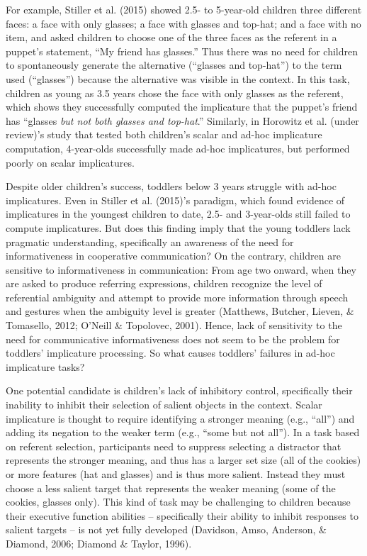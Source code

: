 \documentclass[a4paper,man,apacite,floatsintext]{apa6}
\begin{document}
For example, Stiller et al. (2015) showed 2.5- to 5-year-old children
three different faces: a face with only glasses; a face with glasses and
top-hat; and a face with no item, and asked children to choose one of
the three faces as the referent in a puppet's statement, ``My friend has
glasses.'' Thus there was no need for children to spontaneously generate
the alternative (``glasses and top-hat'') to the term used (``glasses'')
because the alternative was visible in the context. In this task,
children as young as 3.5 years chose the face with only glasses as the
referent, which shows they successfully computed the implicature that
the puppet's friend has ``glasses \emph{but not both glasses and
top-hat}.'' Similarly, in Horowitz et al. (under review)'s study that
tested both children's scalar and ad-hoc implicature computation,
4-year-olds successfully made ad-hoc implicatures, but performed poorly
on scalar implicatures.

Despite older children's success, toddlers below 3 years struggle with
ad-hoc implicatures. Even in Stiller et al. (2015)'s paradigm, which
found evidence of implicatures in the youngest children to date, 2.5-
and 3-year-olds still failed to compute implicatures. But does this
finding imply that the young toddlers lack pragmatic understanding,
specifically an awareness of the need for informativeness in cooperative
communication? On the contrary, children are sensitive to
informativeness in communication: From age two onward, when they are
asked to produce referring expressions, children recognize the level of
referential ambiguity and attempt to provide more information through
speech and gestures when the ambiguity level is greater (Matthews,
Butcher, Lieven, \& Tomasello, 2012; O'Neill \& Topolovec, 2001). Hence,
lack of sensitivity to the need for communicative informativeness does
not seem to be the problem for toddlers' implicature processing. So what
causes toddlers' failures in ad-hoc implicature tasks?

One potential candidate is children's lack of inhibitory control,
specifically their inability to inhibit their selection of salient
objects in the context. Scalar implicature is thought to require
identifying a stronger meaning (e.g., ``all'') and adding its negation
to the weaker term (e.g., ``some but not all''). In a task based on
referent selection, participants need to suppress selecting a distractor
that represents the stronger meaning, and thus has a larger set size
(all of the cookies) or more features (hat and glasses) and is thus more
salient. Instead they must choose a less salient target that represents
the weaker meaning (some of the cookies, glasses only). This kind of
task may be challenging to children because their executive function
abilities -- specifically their ability to inhibit responses to salient
targets -- is not yet fully developed (Davidson, Amso, Anderson, \&
Diamond, 2006; Diamond \& Taylor, 1996).
\end{document}
